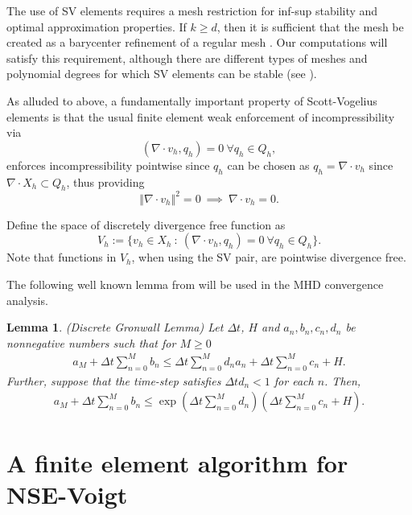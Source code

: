 \documentclass[11pt]{article}%
\numberwithin{equation}{section}
\newcommand{\norm}[1]{\left\Vert#1\right\Vert}
\newtheorem{lemma}{Lemma}[section]
\begin{document}
The use of SV elements requires a mesh restriction for inf-sup stability and optimal approximation properties.  If $k\ge d$, then it is sufficient that the mesh
be created as a barycenter refinement of a regular mesh \cite{Z05,qin:phd}.  Our computations will satisfy this requirement, although there are different types of meshes and polynomial degrees for which SV elements can be stable (see \cite{zhang08,Z10,Z10a}).

As alluded to above, a fundamentally important property of Scott-Vogelius elements is that the usual finite element weak enforcement of incompressibility via
\[
(\nabla \cdot v_h,q_h)=0 \ \forall q_h\in Q_h,
\]
enforces incompressibility pointwise since $q_h$ can be chosen as $q_h=\nabla\cdot v_h$ since $\nabla \cdot X_h \subset Q_h$, thus providing
\[
\norm{\nabla \cdot v_h}^{2}=0 \ \implies \ \nabla \cdot v_h=0.
\]

Define the space of discretely divergence free function as
\[
V_h := \{ v_h \in X_h\ : \ (\nabla \cdot v_h,q_h)=0 \ \forall q_h \in Q_h \}.
\]
Note that functions in $V_h$, when using the SV pair, are pointwise divergence free.

The following well known lemma from \cite{HR90} will be used in the MHD convergence analysis.  
\begin{lemma}\label{GronwallLemma}(Discrete Gronwall Lemma)
Let $\Delta t$, $H$ and $a_{n},b_{n},c_{n},d_{n}$ be nonnegative numbers such that for $M \geq 0$
\begin{eqnarray}
a_{M} + \Delta t \sum_{n=0}^{M}b_{n} \leq 
\Delta t \sum_{n=0}^{M}d_{n}a_{n}
+\Delta t\sum_{n=0}^{M}c_{n} + H. \nonumber
\end{eqnarray}
Further, suppose that the time-step satisfies $\Delta t d_n < 1$ for each $n$.  Then,
\begin{eqnarray}
a_{M} + \Delta t \sum_{n=0}^{M}b_{n} \leq 
\exp\left(\Delta t \sum_{n=0}^{M} d_{n} \right) (\Delta t \sum_{n=0}^{M}c_{n} + H).\nonumber
\end{eqnarray}
\end{lemma}



\section{A finite element algorithm for NSE-Voigt}
\end{document}
